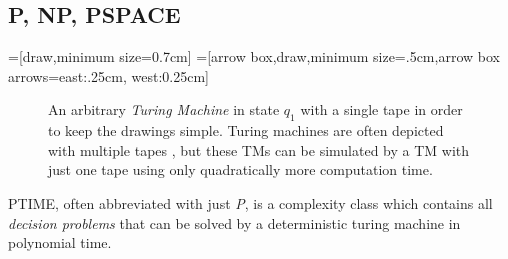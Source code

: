 		\subsection{P, NP, PSPACE}
		
			\edef\sizetape{0.7cm}
			=[draw,minimum size=\sizetape]
			=[arrow box,draw,minimum size=.5cm,arrow box
			arrows={east:.25cm, west:0.25cm}]
		
			\begin{figure}[ht!]
				\centering
				\caption{An arbitrary \textit{Turing Machine} in state $q_1$ with a single tape in order to keep the drawings simple. Turing machines are often depicted with multiple tapes \cite{Arora.2010}, but these TMs can be simulated by a TM with just one tape using only quadratically more computation time.}
				\label{fig:prelims:tm}
			\end{figure}
			
			\begin{defStrich}[PTIME]
				PTIME, often abbreviated with just \textit{P}, is a complexity class which contains all \textit{decision problems} that can be solved by a deterministic turing machine in polynomial time.
			\end{defStrich}
			

